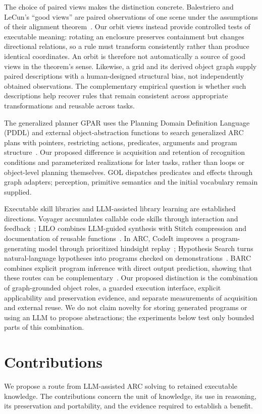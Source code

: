 \documentclass[11pt]{article}
\begin{document}
The choice of paired views makes the distinction concrete. Balestriero and LeCun's ``good views'' are paired observations of one scene under the assumptions of their alignment theorem~\cite{jepa}. Our orbit views instead provide controlled tests of executable meaning: rotating an enclosure preserves containment but changes directional relations, so a rule must transform consistently rather than produce identical coordinates. An orbit is therefore not automatically a source of good views in the theorem's sense. Likewise, a grid and its derived object graph supply paired descriptions with a human-designed structural bias, not independently obtained observations. The complementary empirical question is whether such descriptions help recover rules that remain consistent across appropriate transformations and reusable across tasks.

The generalized planner GPAR uses the Planning Domain Definition Language (PDDL) and external object-abstraction functions to search generalized ARC plans with pointers, restricting actions, predicates, arguments and program structure~\cite{gpar}. Our proposed difference is acquisition and retention of recognition conditions and parameterized realizations for later tasks, rather than loops or object-level planning themselves. GOL dispatches predicates and effects through graph adapters; perception, primitive semantics and the initial vocabulary remain supplied.

Executable skill libraries and LLM-assisted library learning are established directions. Voyager accumulates callable code skills through interaction and feedback~\cite{voyager}; LILO combines LLM-guided synthesis with Stitch compression and documentation of reusable functions~\cite{lilo}. In ARC, CodeIt improves a program-generating model through prioritized hindsight replay~\cite{codeit}; Hypothesis Search turns natural-language hypotheses into programs checked on demonstrations~\cite{hypothesissearch}. BARC combines explicit program inference with direct output prediction, showing that these routes can be complementary~\cite{barc}. Our proposed distinction is the combination of graph-grounded object roles, a guarded execution interface, explicit applicability and preservation evidence, and separate measurements of acquisition and external reuse. We do not claim novelty for storing generated programs or using an LLM to propose abstractions; the experiments below test only bounded parts of this combination.

\section{Contributions}\label{sec:contributions}
We propose a route from LLM-assisted ARC solving to retained executable knowledge. The contributions concern the unit of knowledge, its use in reasoning, its preservation and portability, and the evidence required to establish a benefit.
\end{document}
